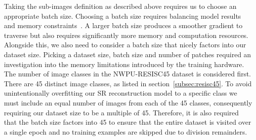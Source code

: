 Taking the sub-images definition as described above requires us to choose an appropriate batch size. Choosing a batch size requires balancing model results and memory constraints~\cite{batchSizeTest}. A larger batch size produces a smoother gradient to traverse but also requires significantly more memory and computation resources. Alongside this, we also need to consider a batch size that nicely factors into our dataset size. Picking a dataset size, batch size and number of patches required an investigation into the memory limitations introduced by the training hardware. The number of image classes in the NWPU-RESISC45 dataset is considered first. There are 45 distinct image classes, as listed in section~\ref{subsec:resisc45}. To avoid unintentionally overfitting our SR reconstruction model to a specific class we must include an equal number of images from each of the 45 classes, consequently requiring our dataset size to be a multiple of 45. Therefore, it is also required that the batch size factors into 45 to ensure that the entire dataset is visited over a single epoch and no training examples are skipped due to division remainders. 

